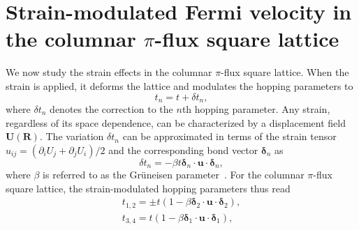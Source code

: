 \documentclass[aps, twocolumn, floatfix, superscriptaddress, prb]{revtex4-1}
\begin{document}
\section{Strain-modulated Fermi velocity in the columnar $\pi$-flux square lattice}
\label{sec3}
We now study the strain effects in the columnar $\pi$-flux square lattice. When the strain is applied, it deforms the lattice and modulates the hopping parameters to
%
\begin{equation}
  t_n=t+\delta t_n,
\end{equation}
%
where $\delta t_n$ denotes the correction to the $n$th hopping parameter. Any strain, regardless of its space dependence, can be characterized by a displacement field ${\bm U}(\bm R)$. The variation $\delta t_n$ can be approximated in terms of the strain tensor $u_{ij}= (\partial_iU_j+\partial_jU_i)/2$ and the corresponding bond vector ${\bm \delta}_n$ as
%
\begin{equation}\label{dtn}
{
\delta t_n=-\beta t{\bm\delta}_n\cdot{\bm u}\cdot{\bm \delta_n},
}
\end{equation}
%
where $\beta$ is referred to as the Gr\"{u}neisen parameter~\cite{vozmediano2010}. For the columnar $\pi$-flux square lattice, the strain-modulated hopping parameters thus read
%
%
\begin{equation}\label{t_mod}
\begin{split}
{
t_{1,2}=\pm t(1-\beta\bm{\delta}_2\cdot\bm{u}\cdot\bm{\delta}_2),
}
\\
{
t_{3,4}=t(1-\beta\bm{\delta}_1\cdot\bm{u}\cdot\bm{\delta}_1),
}
\end{split}
\end{equation}
\end{document}
